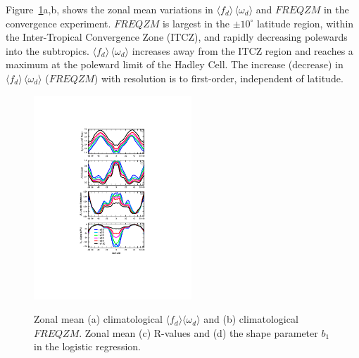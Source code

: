 \documentclass[times]{qjrms4}
\begin{document}
Figure~\ref{fig:4zonal}a,b, shows the zonal mean variations in $\langle f_{d} \rangle \, \langle \omega_{d} \rangle$ and $FREQZM$ in the convergence experiment. $FREQZM$ is largest in the $\pm 10^{\circ}$ latitude region, within the Inter-Tropical Convergence Zone (ITCZ), and rapidly decreasing polewards into the subtropics. $\langle f_{d} \rangle \, \langle \omega_{d} \rangle$ increases away from the ITCZ region and reaches a maximum at the poleward limit of the Hadley Cell. The increase (decrease) in $\langle f_{d} \rangle \, \langle \omega_{d} \rangle$ ($FREQZM$) with resolution is to first-order, independent of latitude.

\begin{figure}
\begin{center}
\noindent\includegraphics[width=14pc,angle=0]{figs/temp_4zonal.pdf}\\
\end{center}
\caption{Zonal mean (a) climatological $\langle f_{d} \rangle \langle \omega_{d} \rangle$ and (b) climatological $FREQZM$. Zonal mean (c) R-values and (d) the shape parameter $b_1$ in the logistic regression.}
\label{fig:4zonal}
\end{figure}
\end{document}
